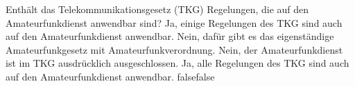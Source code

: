     {Enthält das Telekommunikationsgesetz (TKG) Regelungen, die auf den Amateurfunkdienst anwendbar sind?}
    {Ja, einige Regelungen des TKG sind auch auf den Amateurfunkdienst anwendbar.}
    {Nein, dafür gibt es das eigenständige Amateurfunkgesetz mit Amateurfunkverordnung.}
    {Nein, der Amateurfunkdienst ist im TKG ausdrücklich ausgeschlossen.}
    {Ja, alle Regelungen des TKG sind auch auf den Amateurfunkdienst anwendbar.}
    {false}{false}